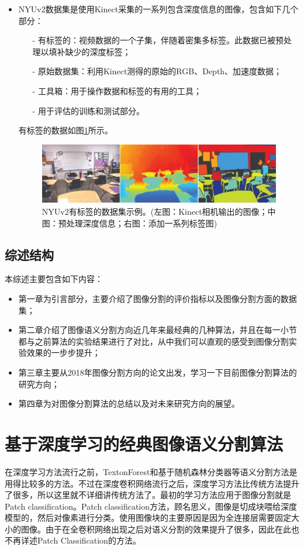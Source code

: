 \documentclass[cn]{elegantbook}
\begin{document}
\begin{itemize}
	\item NYUv2数据集是使用Kinect采集的一系列包含深度信息的图像，包含如下几个部分：
	\begin{itemize}
		\item[-] 有标签的：视频数据的一个子集，伴随着密集多标签。此数据已被预处理以填补缺少的深度标签；
		\item[-] 原始数据集：利用Kinect测得的原始的RGB、Depth、加速度数据；
		\item[-] 工具箱：用于操作数据和标签的有用的工具；
		\item[-] 用于评估的训练和测试部分。
	\end{itemize}
    有标签的数据如图\ref{nyu1}所示。
    \begin{figure}[!h]
    	\centering
    	\includegraphics[width=\textwidth]{images/nyu1}
    	\caption{\label{nyu1}NYUv2有标签的数据集示例。(左图：Kinect相机输出的图像；中图：预处理深度信息；右图：添加一系列标签图)}
    \end{figure}
\end{itemize}

\section{综述结构}
本综述主要包含如下内容：
\begin{itemize}
	\item 第一章为引言部分，主要介绍了图像分割的评价指标以及图像分割方面的数据集；
	\item 第二章介绍了图像语义分割方向近几年来最经典的几种算法，并且在每一小节都与之前算法的实验结果进行了对比，从中我们可以直观的感受到图像分割实验效果的一步步提升；
	\item 第三章主要从2018年图像分割方向的论文出发，学习一下目前图像分割算法的研究方向；
	\item 第四章为对图像分割算法的总结以及对未来研究方向的展望。
\end{itemize}
\chapter{基于深度学习的经典图像语义分割算法}
在深度学习方法流行之前，TextonForest和基于随机森林分类器等语义分割方法是用得比较多的方法。不过在深度卷积网络流行之后，深度学习方法比传统方法提升了很多，所以这里就不详细讲传统方法了。最初的学习方法应用于图像分割就是Patch classification。Patch classification方法，顾名思义，图像是切成块喂给深度模型的，然后对像素进行分类。使用图像块的主要原因是因为全连接层需要固定大小的图像。由于在全卷积网络出现之后对语义分割的效果提升了很多，因此在此也不再详述Patch Classification的方法。
\end{document}

